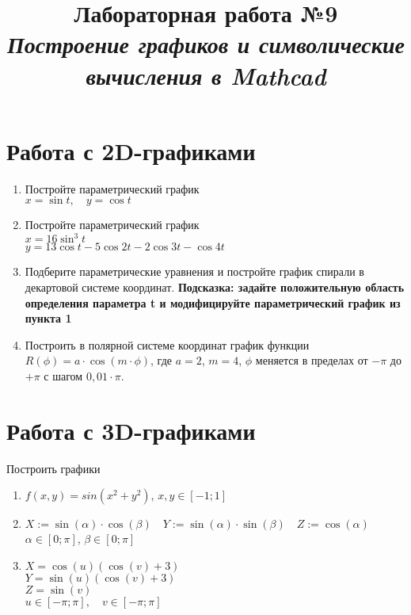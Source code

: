\documentclass[14pt,a4paper]{article}
\title{Лабораторная работа №9 \\ \textit{Построение графиков и символические вычисления в Mathcad}}
\begin{document}
\maketitle

\progress{}
\section{Работа с 2D-графиками}
\begin{enumerate}
	\item Постройте параметрический график \\
	$x=\sin{t}, \quad y = \cos{t}$
	\item Постройте параметрический график \\
	$x=16\sin^3t$ \\
	$y=13\cos{t} - 5\cos{2t} - 2\cos{3t} - \cos{4t}$
	\item Подберите параметрические уравнения и постройте график спирали в декартовой системе координат. \textbf{Подсказка: задайте положительную область определения параметра t и модифицируйте параметрический график из пункта 1}\\
	\item Построить в полярной системе координат график функции $R(\phi) = a\cdot\cos{(m\cdot\phi)}$, где $a = 2$, $m = 4$, $\phi$ меняется в пределах от $-\pi$ до $+\pi$ с шагом $0,01\cdot\pi$.
\end{enumerate}

\section{Работа с 3D-графиками}
\noindent Построить графики
\begin{enumerate}
	\item $f(x,y) = sin(x^2+y^2)$, $x,y \in [-1;1]$
	\item $X:=\sin \left(\alpha\right) \cdot \cos \left(\beta\right) \quad Y:=\sin \left(\alpha\right) \cdot \sin \left(\beta\right) \quad Z:=\cos \left(\alpha\right)$\\
	$\alpha \in [0;\pi]$, $\beta \in [0;\pi]$
	\item $X=\cos{(u)}(\cos{(v)}+3)$ \\
	$Y=\sin{(u)}(\cos{(v)}+3)$ \\
	$Z=\sin{(v)}$ \\
	$u\in [−\pi;\pi],\quad v \in [−\pi;\pi]$
\end{enumerate}
\end{document}
